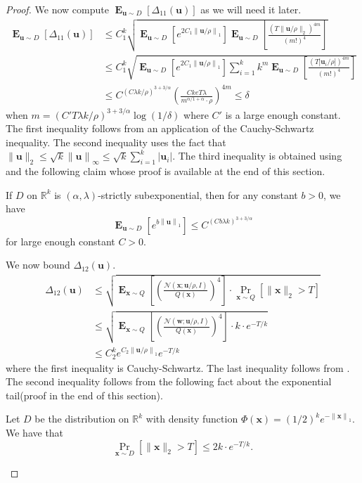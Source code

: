 \documentclass{theoretics}
\newcommand\twonorm[1]{\|#1\|_2}
\newcommand\norm[1]{\left\| #1 \right\|}
\renewcommand\vec[1]{\mathbf{#1}}
\DeclareMathOperator*{\E}{\mathbf{E}}
\newcommand{\R}{\mathbb{R}}
\newcommand{\1}{\Ind}
\newcommand{\x}{\vec x}
\newcommand{\vu}{\vec u}
\newcommand{\vw}{\vec w}
\newcommand{\Gauss}{\mathcal{N}}
\begin{document}
\begin{proof}
      We now compute $\E_{\vu\sim D}\left[\Delta_{11}(\vu)\right]$ as we will need it later.
      \begin{align*}
        \E_{\vu\sim D}\left[{\Delta_{11}(\vu)}\right]&\leq C_1^{k}\sqrt{\E_{\vu\sim D}\left[e^{2C_1\norm{\vu/\rho}_1}\right]\E_{\vu\sim D}\left[\frac{\left(T\twonorm{\vu/\rho}\right)^{4m}}{(m!)^4} \right]}\\
        &\leq C_1^{k}\sqrt{\E_{\vu\sim D}\left[e^{2C_1\norm{\vu/\rho}_1}\right]\sum_{i=1}^{k}k^{m}\E_{\vu\sim D}\left[\frac{\left(T|{\vu_i/\rho}|\right)^{4m}}{(m!)^4} \right]}\\
        &\leq C^{\left(C\lambda k/\rho\right)^{3+3/\alpha}}\left(\frac{C{k}eT\lambda}{ m^{\alpha/1+\alpha}\cdot \rho}\right)^{4m}
        \leq \delta
      \end{align*}
      when $m= (C'T\lambda k/\rho)^{3+3/\alpha}\log(1/\delta)$ where $C'$ is a large enough constant. The first inequality follows from an application of the Cauchy-Schwartz inequality. The second inequality uses the fact that $\twonorm{\vu}\leq \sqrt{k}\norm{\vu}_{\infty}\leq \sqrt{k}\sum_{i=1}^k|\vu_i|$. The third inequality is obtained using  and the following claim whose proof is available at the end of this section.      
\begin{lemma}
    \label{lem:exp_norm}
    If $D$ on $\R^k$ is $(\alpha,\lambda)$-strictly subexponential, then for any constant $b>0$, we have
    \[
    \E_{\vu\sim D}\left[e^{b\norm{\vu}_1}\right]    \leq C^{\left(Cb\lambda k\right)^{3+3/\alpha} }
    \] for large enough constant $C>0$.
\end{lemma}
      We now bound $\Delta_{12}(\vu)$. 
      \begin{align*}
        \Delta_{12}(\vu)&\leq \sqrt{\E_{\x\sim Q}\left[\left(\frac{\Gauss(\x;\vu/\rho,I)}{Q(\x)}\right)^4\right]\cdot \Pr_{\x\sim Q}[\twonorm{\x}>T]}\\
        &\leq \sqrt{\E_{\x\sim Q}\left[\left(\frac{\Gauss(\vw;\vu/\rho,I)}{Q(\x)}\right)^4\right]\cdot k\cdot  e^{-T/k}}\\
        &\leq C_2^ke^{C_2\norm{\vu/\rho}_1}e^{-T/k}
      \end{align*}
      where the first inequality is Cauchy-Schwartz. The last inequality follows from . The second inequality follows from the following fact about the exponential tail(proof in the end of this section).
\begin{lemma}
\label{lem:exp_tail}
    Let $D$ be the distribution on $\R^k$ with density function $\Phi(\x)=(1/2)^ke^{-\norm{\x}_1}$. We have that \[
        \Pr_{\x\sim D}\left[\twonorm{\x}>T\right]\leq 2k\cdot e^{-T/k}.\]
\end{lemma}


\end{proof}
\end{document}
